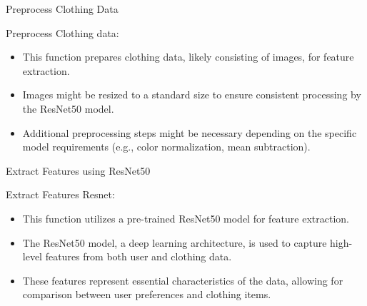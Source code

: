 \begin{algorithm}[H]
  \SetAlgoLined


  \caption{Preprocess Clothing Data}
  \label{alg:preprocess_clothing_data}
  \BlankLine

\end{algorithm}
 \BlankLine
Preprocess Clothing data:
 \BlankLine
\begin{itemize}
    \item This function prepares clothing data, likely consisting of images, for feature extraction.
    \item Images might be resized to a standard size to ensure consistent processing by the ResNet50 model.
    \item Additional preprocessing steps might be necessary depending on the specific model requirements (e.g., color normalization, mean subtraction).
\end{itemize}
 \BlankLine
\begin{algorithm}[H]
  \SetAlgoLined


  \caption{Extract Features using ResNet50}
  \label{alg:extract_features_resnet}
  \BlankLine

\end{algorithm}
 \BlankLine
Extract Features Resnet:
 \BlankLine
\begin{itemize}
    \item This function utilizes a pre-trained ResNet50 model for feature extraction.
    \item The ResNet50 model, a deep learning architecture, is used to capture high-level features from both user and clothing data.
    \item These features represent essential characteristics of the data, allowing for comparison between user preferences and clothing items.
\end{itemize}
